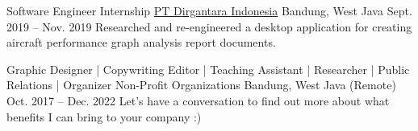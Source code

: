 \begin{cventries}



\cventry
{Software Engineer Internship} %
{\href{https://www.indonesian-aerospace.com/}{PT Dirgantara Indonesia}} %
{Bandung, West Java} %
{Sept. 2019 -- Nov. 2019} %
{ %
Researched and re-engineered a desktop application for creating aircraft performance graph analysis report documents.
}


\cventry
{Graphic Designer | Copywriting Editor | Teaching Assistant | Researcher | Public Relations | Organizer} %
{Non-Profit Organizations} %
{Bandung, West Java (Remote)} %
{Oct. 2017 -- Dec. 2022} %
{ %
Let's have a conversation to find out more about what benefits I can bring to your company :)
}




\end{cventries}
